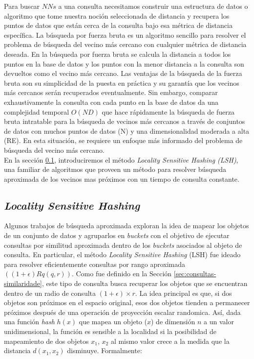 Para buscar $NNs$ a una consulta necesitamos construir una estructura de datos o algoritmo que tome nuestra noción seleccionada de distancia y recupera los puntos de datos que están cerca de la consulta bajo esa métrica de distancia específica. La búsqueda por fuerza bruta es un algoritmo sencillo para resolver el problema de búsqueda del vecino más cercano con cualquier métrica de distancia deseada. En la búsqueda por fuerza bruta se calcula la distancia a todos los puntos en la base de datos y los puntos  con la menor distancia a la consulta son devueltos como el vecino más cercano. Las ventajas de la búsqueda de la fuerza bruta son su simplicidad de la puesta en práctica y su garantía que los vecinos más cercanos   serán recuperados eventualmente. Sin embargo, comparar exhaustivamente la consulta con cada punto en la base de datos da una complejidad temporal $O (ND)$ que hace rápidamente la búsqueda de fuerza bruta intratable para la búsqueda de vecinos más cercanos a través de conjuntos de datos con muchos puntos de datos (N) y una dimensionalidad moderada a alta (RE). En esta situación, se requiere un enfoque más informado del problema de búsqueda del vecino más cercano.\\
 
En la  sección \ref{sec:lsh}, introduciremos el método \textit{Locality Sensitive Hashing (LSH)}, una familiar de algoritmos que proveen un método para resolver búsqueda aproximada de los vecinos mas próximos con un tiempo de consulta constante. 

\subsection{\textit{Locality Sensitive Hashing}}\label{sec:lsh}

Algunos trabajos de búsqueda aproximada  \cite{lsh_hamming,Datar2004,hashing_algoritghms_survey} exploran la idea de mapear los objetos de un conjunto de datos y agruparlos en  \textit{buckets} con el objetivo de ejecutar consultas por similitud aproximada dentro de los  \textit{buckets} asociados al objeto de consulta. En particular, el método \textit{Locality Sensitive Hashing} (LSH) fue ideado para resolver eficientemente consultas por rango aproximada $((1+\epsilon) Rq(q, r))$. Como fue definido en la Sección  \ref{sec:consultas-similaridade}, este tipo de consulta busca recuperar los objetos que se encuentran dentro de un radio de consulta $(1+\epsilon) \times r$. La idea principal es que, si dos objetos son próximos en el espacio original, esos dos objetos tienden a permanecer próximos después de una operación de proyección escalar randomica. Así, dada una función \textit{hash} $h(x)$ que mapea un objeto ($x$) de dimensión $n$ a un valor unidimensional, la función es sensible a la localidad si la posibilidad de mapeamiento de dos objetos $x_1$, $x_2$ al mismo valor crece a la medida que la distancia  $d(x_1, x_2)$  disminuye. Formalmente:

